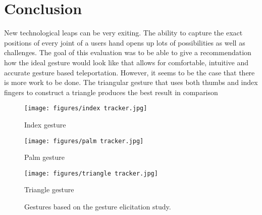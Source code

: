 \chapter{Conclusion}

New technological leaps can be very exiting. The ability to capture the exact positions of every joint of a users hand opens up lots of possibilities as well as challenges. The goal of this evaluation was to be able to give a recommendation how the ideal gesture would look like that allows for comfortable, intuitive and accurate gesture based teleportation. However, it seems to be the case that there is more work to be done. The triangular gesture that uses both thumbs and index fingers to construct a triangle produces the best result in comparison 


\begin{figure}[!h]
        \texttt{[image: figures/index tracker.jpg]}
        \caption{Index gesture}
    \endminipage\hfill
        \texttt{[image: figures/palm tracker.jpg]}
        \caption{Palm gesture}
    \endminipage
        \texttt{[image: figures/triangle tracker.jpg]}
        \caption{Triangle gesture}
    \endminipage
    \hfill
    \caption{Gestures based on the gesture elicitation study.}
\end{figure}
